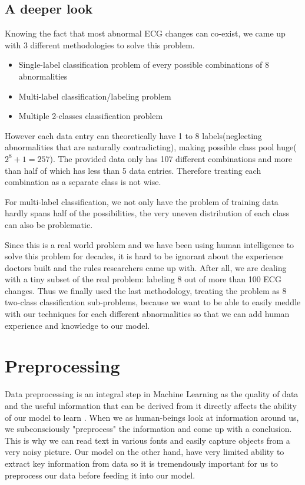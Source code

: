 \documentclass[runningheads]{llncs}
\begin{document}
\subsection{A deeper look}
Knowing the fact that most abnormal ECG changes can co-exist, we came up with 3 different methodologies to solve this problem. 

\begin{itemize}
	\item Single-label classification problem of every possible combinations of 8 abnormalities
	\item Multi-label classification/labeling problem
	\item Multiple 2-classes classification problem
\end{itemize}

However each data entry can theoretically have 1 to 8 labels(neglecting abnormalities that are naturally contradicting), making possible class pool huge($2^8 + 1 = 257$). The provided data only has 107 different combinations and more than half of which has less than 5 data entries. Therefore treating each combination as a separate class is not wise. 

For multi-label classification, we not only have the problem of training data hardly spans half of the possibilities, the very uneven distribution of each class can also be problematic. 

Since this is a real world problem and we have been using human intelligence to solve this problem for decades, it is hard to be ignorant about the experience doctors built and the rules researchers came up with. After all, we are dealing with a tiny subset of the real problem: labeling 8 out of more than 100 ECG changes\cite{litfl}. Thus we finally used the last methodology, treating the problem as 8 two-class classification sub-problems, because we want to be able to easily meddle with our techniques for each different abnormalities so that we can add human experience and knowledge to our model.

\section{Preprocessing}
Data preprocessing is an integral step in Machine Learning as the quality of data and the useful information that can be derived from it directly affects the ability of our model to learn \cite{Dhairya}. When we as human-beings look at information around us, we subconsciously "preprocess" the information and come up with a conclusion. This is why we can read text in various fonts and easily capture objects from a very noisy picture. Our model on the other hand, have very limited ability to extract key information from data so it is tremendously important for us to preprocess our data before feeding it into our model.
\end{document}
